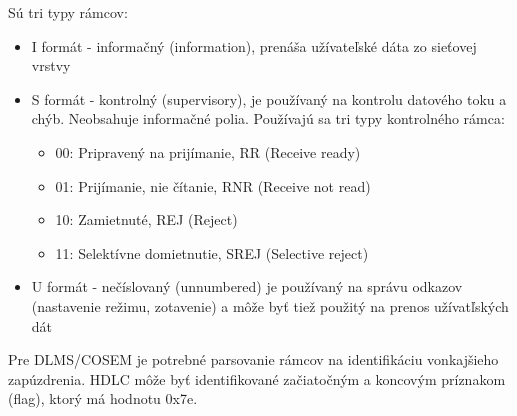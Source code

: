Sú tri typy rámcov:
\begin{itemize}
\item I formát - informačný (information), prenáša užívateľské dáta zo sieťovej vrstvy 
\item S formát - kontrolný (supervisory), je používaný na kontrolu datového toku a chýb. Neobsahuje informačné polia. Používajú sa tri typy kontrolného rámca:
\begin{itemize}
\item 00: Pripravený na prijímanie, RR (Receive ready)
\item 01: Prijímanie, nie čítanie, RNR (Receive not read)
\item 10: Zamietnuté, REJ (Reject)
\item 11: Selektívne domietnutie, SREJ (Selective reject)
\end{itemize}
\item U formát - nečíslovaný (unnumbered) je používaný na správu odkazov (nastavenie režimu, zotavenie) a môže byť tiež použitý na prenos užívatľských dát
\end{itemize} \par
Pre DLMS/COSEM je potrebné parsovanie rámcov na identifikáciu vonkajšieho zapúzdrenia. HDLC môže byť identifikované začiatočným a koncovým príznakom (flag), ktorý má hodnotu 0x7e\cite{dlmscosem}.











